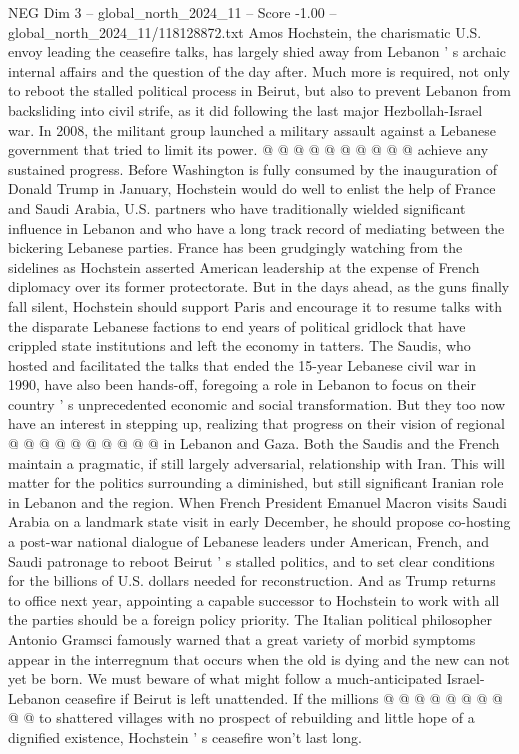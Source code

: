 \begin{textsample}{NEG Dim 3 – global\_north\_2024\_11 – Score -1.00 – global\_north\_2024\_11/118128872.txt}
Amos Hochstein, the charismatic U.S. envoy leading the ceasefire talks, has largely shied away from Lebanon ' s archaic internal affairs and the question of the day after.
Much more is required, not only to reboot the stalled political process in Beirut, but also to prevent Lebanon from backsliding into civil strife, as it did following the last major Hezbollah-Israel war.
In 2008, the militant group launched a military assault against a Lebanese government that tried to limit its power. @ @ @ @ @ @ @ @ @ @ achieve any sustained progress.
Before Washington is fully consumed by the inauguration of Donald Trump in January, Hochstein would do well to enlist the help of France and Saudi Arabia, U.S. partners who have traditionally wielded significant influence in Lebanon and who have a long track record of mediating between the bickering Lebanese parties.
France has been grudgingly watching from the sidelines as Hochstein asserted American leadership at the expense of French diplomacy over its former protectorate.
But in the days ahead, as the guns finally fall silent, Hochstein should support Paris and encourage it to resume talks with the disparate Lebanese factions to end years of political gridlock that have crippled state institutions and left the economy in tatters.
The Saudis, who hosted and facilitated the talks that ended the 15-year Lebanese civil war in 1990, have also been hands-off, foregoing a role in Lebanon to focus on their country ' s unprecedented economic and social transformation.
But they too now have an interest in stepping up, realizing that progress on their vision of regional @ @ @ @ @ @ @ @ @ @ in Lebanon and Gaza.
Both the Saudis and the French maintain a pragmatic, if still largely adversarial, relationship with Iran.
This will matter for the politics surrounding a diminished, but still significant Iranian role in Lebanon and the region.
When French President Emanuel Macron visits Saudi Arabia on a landmark state visit in early December, he should propose co-hosting a post-war national dialogue of Lebanese leaders under American, French, and Saudi patronage to reboot Beirut ' s stalled politics, and to set clear conditions for the billions of U.S. dollars needed for reconstruction.
And as Trump returns to office next year, appointing a capable successor to Hochstein to work with all the parties should be a foreign policy priority.
The Italian political philosopher Antonio Gramsci famously warned that a great variety of morbid symptoms appear in the interregnum that occurs when the old is dying and the new can not yet be born.
We must beware of what might follow a much-anticipated Israel-Lebanon ceasefire if Beirut is left unattended.
If the millions @ @ @ @ @ @ @ @ @ @ to shattered villages with no prospect of rebuilding and little hope of a dignified existence, Hochstein ' s ceasefire won't last long.

\end{textsample}
